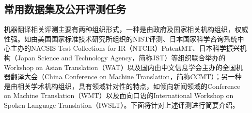 
\subsection{常用数据集及公开评测任务}

\parinterval 机器翻译相关评测主要有两种组织形式，一种是由政府及国家相关机构组织，权威性强。如由美国国家标准技术研究所组织的NIST评测、日本国家科学咨询系统中心主办的NACSIS Test Collections for IR（NTCIR）PatentMT、日本科学振兴机构（Japan Science and Technology Agency，简称JST）等组织联合举办的Workshop on Asian Translation（WAT）以及国内由中文信息学会主办的全国机器翻译大会（China Conference on Machine Translation，简称CCMT）；另一种是由相关学术机构组织，具有领域针对性的特点，如倾向新闻领域的Conference on Machine Translation（WMT）以及面向口语的International Workshop on Spoken Language Translation（IWSLT）。下面将针对上述评测进行简要介绍。

